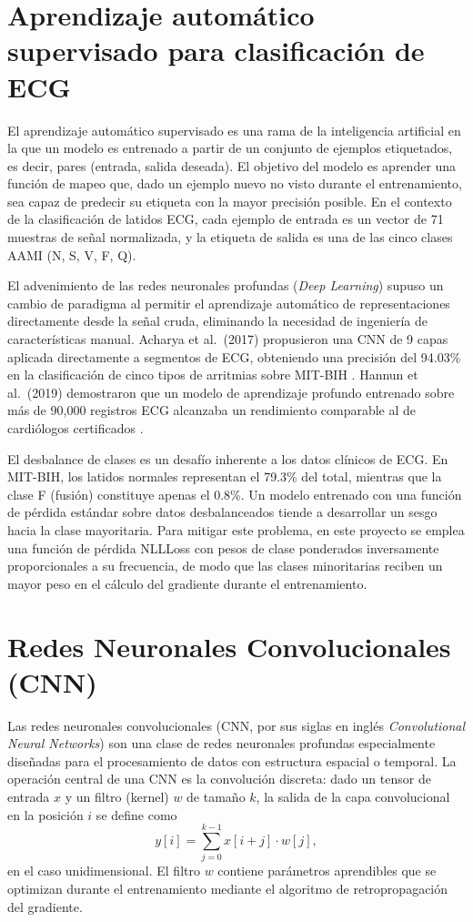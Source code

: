 \section{Aprendizaje automático supervisado para clasificación de ECG}

El aprendizaje automático supervisado es una rama de la inteligencia artificial en la que un modelo es entrenado a partir de un conjunto de ejemplos etiquetados, es decir, pares (entrada, salida deseada). El objetivo del modelo es aprender una función de mapeo que, dado un ejemplo nuevo no visto durante el entrenamiento, sea capaz de predecir su etiqueta con la mayor precisión posible. En el contexto de la clasificación de latidos ECG, cada ejemplo de entrada es un vector de 71 muestras de señal normalizada, y la etiqueta de salida es una de las cinco clases AAMI (N, S, V, F, Q).

El advenimiento de las redes neuronales profundas (\textit{Deep Learning}) supuso un cambio de paradigma al permitir el aprendizaje automático de representaciones directamente desde la señal cruda, eliminando la necesidad de ingeniería de características manual. Acharya et al.\ (2017) propusieron una CNN de 9 capas aplicada directamente a segmentos de ECG, obteniendo una precisión del 94.03\% en la clasificación de cinco tipos de arritmias sobre MIT-BIH \cite{Acharya2017}. Hannun et al.\ (2019) demostraron que un modelo de aprendizaje profundo entrenado sobre más de 90,000 registros ECG alcanzaba un rendimiento comparable al de cardiólogos certificados \cite{Hannun2019}.

El desbalance de clases es un desafío inherente a los datos clínicos de ECG. En MIT-BIH, los latidos normales representan el 79.3\% del total, mientras que la clase F (fusión) constituye apenas el 0.8\%. Un modelo entrenado con una función de pérdida estándar sobre datos desbalanceados tiende a desarrollar un sesgo hacia la clase mayoritaria. Para mitigar este problema, en este proyecto se emplea una función de pérdida NLLLoss con pesos de clase ponderados inversamente proporcionales a su frecuencia, de modo que las clases minoritarias reciben un mayor peso en el cálculo del gradiente durante el entrenamiento.

\section{Redes Neuronales Convolucionales (CNN)}

Las redes neuronales convolucionales (CNN, por sus siglas en inglés \textit{Convolutional Neural Networks}) son una clase de redes neuronales profundas especialmente diseñadas para el procesamiento de datos con estructura espacial o temporal. La operación central de una CNN es la convolución discreta: dado un tensor de entrada $x$ y un filtro (kernel) $w$ de tamaño $k$, la salida de la capa convolucional en la posición $i$ se define como
\begin{equation}
y[i] = \sum_{j=0}^{k-1} x[i+j] \cdot w[j],
\end{equation}
en el caso unidimensional. El filtro $w$ contiene parámetros aprendibles que se optimizan durante el entrenamiento mediante el algoritmo de retropropagación del gradiente.


